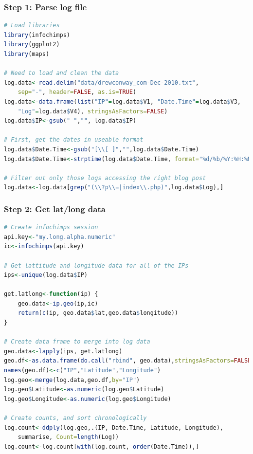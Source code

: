 \documentclass[xcolor=dvipsnames, 9pt,handout]{beamer}
\begin{document}
\begin{frame}[fragile]
    \frametitle{Step 1: Parse log file}
    \scriptsize{\begin{lstlisting}[language=R]
# Load libraries
library(infochimps)
library(ggplot2)
library(maps)

# Need to load and clean the data
log.data<-read.delim("data/drewconway_com-Dec-2010.txt", 
    sep="-", header=FALSE, as.is=TRUE)
log.data<-data.frame(list("IP"=log.data$V1, "Date.Time"=log.data$V3, 
    "Log"=log.data$V4), stringsAsFactors=FALSE)
log.data$IP<-gsub(" ","", log.data$IP)

# First, get the dates in useable format
log.data$Date.Time<-gsub("[\\[ ]","",log.data$Date.Time)
log.data$Date.Time<-strptime(log.data$Date.Time, format="%d/%b/%Y:%H:%M:%S ")

# Filter out only those logs accessing the right blog post
log.data<-log.data[grep("(\\?p\\=|index\\.php)",log.data$Log),]
    \end{lstlisting}}
\end{frame}

\begin{frame}[fragile]
    \frametitle{Step 2: Get lat/long data}
    \scriptsize{\begin{lstlisting}[language=R]
# Create infochimps session
api.key<-"my.long.alpha.numeric"
ic<-infochimps(api.key)

# Get lattitude and longitude data for all of the IPs
ips<-unique(log.data$IP)

get.latlong<-function(ip) {
    geo.data<-ip.geo(ip,ic)
    return(c(ip, geo.data$lat,geo.data$longitude))
}

# Create data frame to merge into log data
geo.data<-lapply(ips, get.latlong)  
geo.df<-as.data.frame(do.call("rbind", geo.data),stringsAsFactors=FALSE)
names(geo.df)<-c("IP","Latitude","Longitude")
log.geo<-merge(log.data,geo.df,by="IP")
log.geo$Latitude<-as.numeric(log.geo$Latitude)
log.geo$Longitude<-as.numeric(log.geo$Longitude)

# Create counts, and sort chronologically
log.count<-ddply(log.geo,.(IP, Date.Time, Latitude, Longitude), 
    summarise, Count=length(Log))
log.count<-log.count[with(log.count, order(Date.Time)),]
    \end{lstlisting}}
\end{frame}
\end{document}
